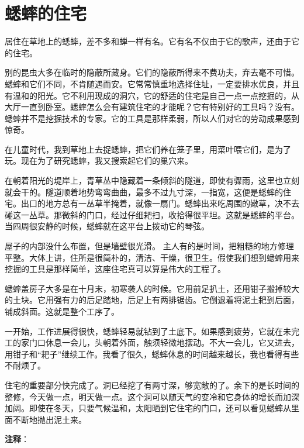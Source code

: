 \documentclass[12pt,UTF-8,openany]{ctexbook}
\begin{document}
\chapter{蟋蟀的住宅}

\begin{Large}
    
    居住在草地上的蟋蟀，差不多和蝉一样有名。它有名不仅由于它的歌声，还由于它的住宅。
    
    别的昆虫大多在临时的隐蔽所藏身。它们的隐蔽所得来不费功夫，弃去毫不可惜。蟋蟀和它们不同，不肯随遇而安。它常常慎重地选择住址，一定要排水优良，并且有温和的阳光。它不利用现成的洞穴，它的舒适的住宅是自己一点一点挖掘的，从大厅一直到卧室。蟋蟀怎么会有建筑住宅的才能呢？它有特别好的工具吗？没有。蟋蟀并不是挖掘技术的专家。它的工具是那样柔弱，所以人们对它的劳动成果感到惊奇。
    
    在儿童时代，我到草地上去捉蟋蟀，把它们养在笼子里，用菜叶喂它们，是为了玩。现在为了研究蟋蟀，我又搜索起它们的巢穴来。
    
    在朝着阳光的堤岸上，青草丛中隐藏着一条倾斜的隧道，即使有骤雨，这里也立刻就会干的。隧道顺着地势弯弯曲曲，最多不过九寸深，一指宽，这便是蟋蟀的住宅。出口的地方总有一丛草半掩着，就像一扇门。蟋蟀出来吃周围的嫩草，决不去碰这一丛草。那微斜的门口，经过仔细耙扫，收拾得很平坦。这就是蟋蟀的平台。当四周很安静的时候，蟋蟀就在这平台上拨动它的琴弦。
    
    屋子的内部没什么布置，但是墙壁很光滑。 主人有的是时间，把粗糙的地方修理平整。大体上讲，住所是很简朴的，清洁、干燥，很卫生。假使我们想到蟋蟀用来挖掘的工具是那样简单，这座住宅真可以算是伟大的工程了。
    
    蟋蟀盖房子大多是在十月末，初寒袭人的时候。它用前足扒土，还用钳子搬掉较大的土块。它用强有力的后足踏地，后足上有两排锯齿。它倒退着将泥土耙到后面，铺成斜面。这就是整个工序了。
    
    一开始，工作进展得很快，蟋蟀轻易就钻到了土底下。如果感到疲劳，它就在未完工的家门口休息一会儿，头朝着外面，触须轻微地摆动。不大一会儿，它又进去，用钳子和“耙子”继续工作。我看了很久，蟋蟀休息的时间越来越长，我也看得有些不耐烦了。
    
    住宅的重要部分快完成了。洞已经挖了有两寸深，够宽敞的了。余下的是长时间的整修，今天做一点，明天做一点。这个洞可以随天气的变冷和它身体的增长而加深加阔。即使在冬天，只要气候温和，太阳晒到它住宅的门口，还可以看见蟋蟀从里面不断地抛出泥土来。
    
\end{Large}


\newpage

\textbf{注释}：
\end{document}

